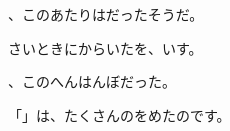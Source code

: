 \documentclass{minimal}
\begin{document}
、このあたりはだったそうだ。

さいときにからいたを、いす。

、このへんはんぼだった。

「」は、たくさんのをめたのです。
\end{document}
